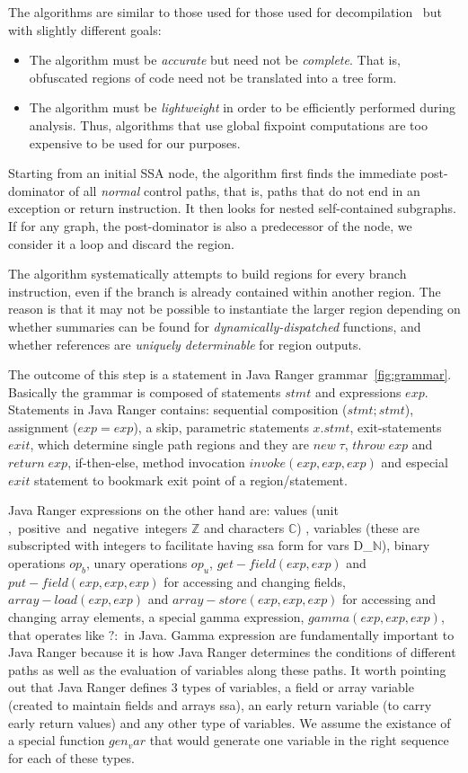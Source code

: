 The algorithms are similar to those used for those used for decompilation~\cite{Yakdan15@decompilation} but with slightly different goals: 
\begin{itemize}
    \item The algorithm must be {\em accurate} but need not be {\em complete}.  That is, obfuscated regions of code need not be translated into a tree form.
    \item The algorithm must be {\em lightweight} in order to be efficiently performed during analysis.  Thus, algorithms that use global fixpoint computations are 
        too expensive to be used for our purposes.
\end{itemize}

Starting from an initial SSA node, the algorithm first finds the immediate post-dominator of all {\em normal} control paths, that is, paths that do not end in an exception or return instruction.  It then looks for nested self-contained subgraphs.  If for any graph, the post-dominator is also a predecessor of the node, we consider it a loop and discard the region.  

The algorithm systematically attempts to build regions for every branch instruction, even if the branch is already contained within another region.  The reason is that it may not be possible to instantiate the larger region depending on whether summaries can be found for {\em dynamically-dispatched} functions, and whether references are {\em uniquely determinable} for region outputs.

The outcome of this step is a statement in Java Ranger grammar~\ref{fig:grammar}. Basically the grammar is composed of statements $stmt$ and expressions $exp$. Statements in Java Ranger contains: sequential composition ($stmt;stmt$), assignment ($exp = exp$), a skip, parametric statements $x.stmt$, exit-statements $exit$, which determine single path regions and they are $new\; \tau$, $throw\; exp$ and $return\; exp$, if-then-else, method invocation $invoke(exp, exp, exp)$ and especial $exit$ statement to bookmark exit point of a region/statement. 

Java Ranger expressions on the other hand are: values (unit \unit, positive and negative integers $\mathbb{Z}$ and characters $\mathbb{C}$) , variables (these are subscripted with integers to facilitate having ssa form for vars D_$\mathbb{N}$), binary operations $op_b$, unary operations $op_u$,  $get-field(exp, exp)$ and $put-field(exp, exp, exp)$ for accessing and changing fields,  $array-load(exp, exp)$ and  $array-store(exp, exp, exp)$ for accessing and changing array elements, a special gamma expression, $gamma(exp, exp, exp)$, that operates like $?:$ in Java. Gamma expression are fundamentally important to Java Ranger because it is how Java Ranger determines the conditions of different paths as well as the evaluation of variables along these paths.  
It worth pointing out that Java Ranger defines 3 types of variables, a field or array variable (created to maintain fields and arrays ssa), an early return variable (to carry early return values) and any other type of variables. We assume the existance of a special function $gen_var$ that would generate one variable in the right sequence for each of these types. 


